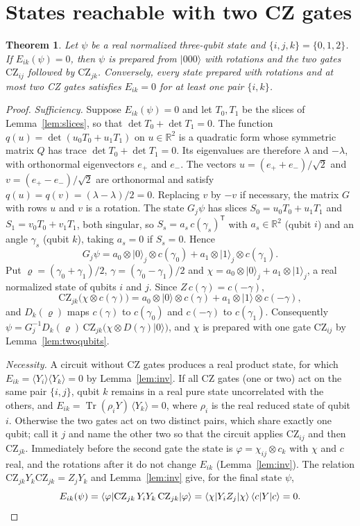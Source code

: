 \documentclass[11pt,a4paper]{article}
\newtheorem{theorem}{Theorem}
\theoremstyle{definition}
\theoremstyle{plain}
\DeclareMathOperator{\Tr}{Tr}
\newcommand{\ket}[1]{\lvert#1\rangle}
\newcommand{\bra}[1]{\langle#1\rvert}
\newcommand{\R}{\mathbb{R}}
\newcommand{\T}{\mathsf{T}}
\newcommand{\CZ}{\mathrm{CZ}}
\begin{document}
\section{States reachable with two CZ gates}\label{sec:two}
\begin{theorem}\label{thm:two}
Let $\psi$ be a real normalized three-qubit state and $\{i,j,k\}=\{0,1,2\}$.
If $E_{ik}(\psi)=0$, then $\psi$ is prepared from $\ket{000}$ with rotations and
the two gates $\CZ_{ij}$ followed by $\CZ_{jk}$. Conversely, every state
prepared with rotations and at most two CZ gates satisfies $E_{ik}=0$ for at
least one pair $\{i,k\}$.
\end{theorem}

\begin{proof}
\emph{Sufficiency.} Suppose $E_{ik}(\psi)=0$ and let $T_0,T_1$ be the slices of
Lemma~\ref{lem:slices}, so that $\det T_0+\det T_1=0$. The function
$q(u)=\det(u_0T_0+u_1T_1)$ on $u\in\R^2$ is a quadratic form whose symmetric
matrix $Q$ has trace $\det T_0+\det T_1=0$. Its eigenvalues are therefore
$\lambda$ and $-\lambda$, with orthonormal eigenvectors $e_+$ and $e_-$. The
vectors $u=(e_++e_-)/\sqrt2$ and $v=(e_+-e_-)/\sqrt2$ are orthonormal and
satisfy $q(u)=q(v)=(\lambda-\lambda)/2=0$. Replacing $v$ by $-v$ if necessary,
the matrix $G$ with rows $u$ and $v$ is a rotation. The state $G_j\psi$ has
slices $S_0=u_0T_0+u_1T_1$ and $S_1=v_0T_0+v_1T_1$, both singular, so
$S_s=a_s\,c(\gamma_s)^\T$ with $a_s\in\R^2$ (qubit $i$) and an angle
$\gamma_s$ (qubit $k$), taking $a_s=0$ if $S_s=0$. Hence
\[
G_j\psi=a_0\otimes\ket0_j\otimes c(\gamma_0)+a_1\otimes\ket1_j\otimes c(\gamma_1).
\]
Put $\varrho=(\gamma_0+\gamma_1)/2$, $\gamma=(\gamma_0-\gamma_1)/2$ and
$\chi=a_0\otimes\ket0_j+a_1\otimes\ket1_j$, a real normalized state of qubits
$i$ and $j$. Since $Z\,c(\gamma)=c(-\gamma)$,
\[
\CZ_{jk}\bigl(\chi\otimes c(\gamma)\bigr)
=a_0\otimes\ket0\otimes c(\gamma)+a_1\otimes\ket1\otimes c(-\gamma),
\]
and $D_k(\varrho)$ maps $c(\gamma)$ to $c(\gamma_0)$ and $c(-\gamma)$ to
$c(\gamma_1)$. Consequently
$\psi=G_j^{-1}D_k(\varrho)\,\CZ_{jk}\bigl(\chi\otimes D(\gamma)\ket0\bigr)$, and
$\chi$ is prepared with one gate $\CZ_{ij}$ by Lemma~\ref{lem:twoqubits}.

\emph{Necessity.} A circuit without CZ gates produces a real product state, for
which $E_{ik}=\langle Y_i\rangle\langle Y_k\rangle=0$ by
Lemma~\ref{lem:inv}. If all CZ gates (one or two) act on the same pair
$\{i,j\}$, qubit $k$ remains in a real pure state uncorrelated with the
others, and $E_{ik}=\Tr(\rho_iY)\,\langle Y_k\rangle=0$, where $\rho_i$ is the
real reduced state of qubit $i$. Otherwise the two gates act on two distinct
pairs, which share exactly one qubit; call it $j$ and name the other two so
that the circuit applies $\CZ_{ij}$ and then $\CZ_{jk}$. Immediately before
the second gate the state is $\varphi=\chi_{ij}\otimes c_k$ with $\chi$ and
$c$ real, and the rotations after it do not change $E_{ik}$
(Lemma~\ref{lem:inv}). The relation $\CZ_{jk}Y_k\CZ_{jk}=Z_jY_k$ and
Lemma~\ref{lem:inv} give, for the final state $\psi$,
\[
E_{ik}(\psi)=\bra\varphi\CZ_{jk}\,Y_iY_k\,\CZ_{jk}\ket\varphi
=\bra\chi Y_iZ_j\ket\chi\,\bra cY\ket c=0. \qedhere
\]
\end{proof}
\end{document}
